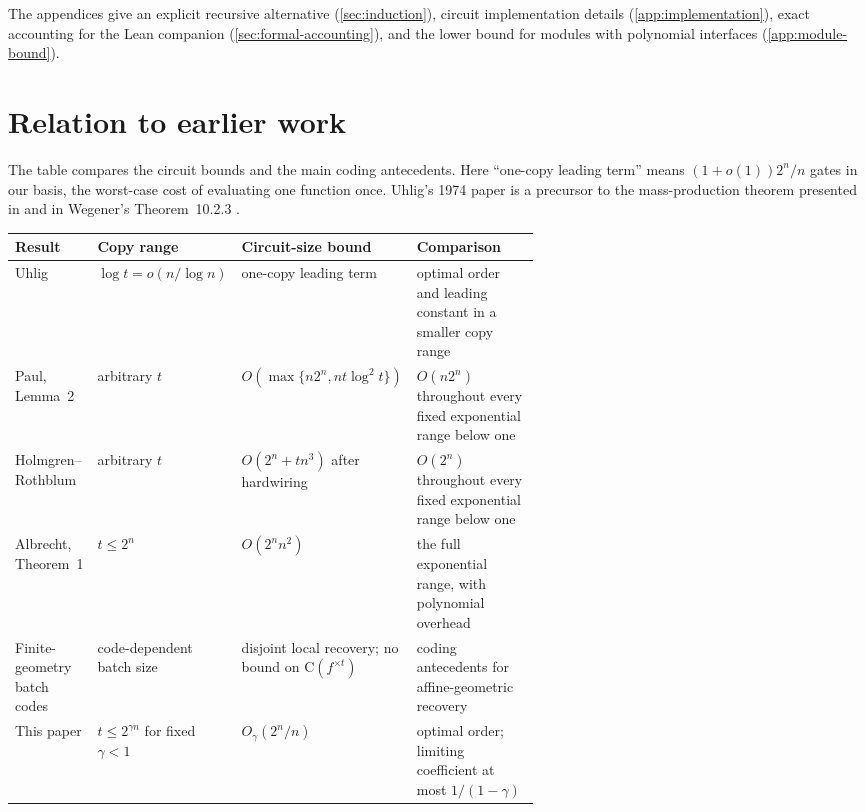 \documentclass[11pt]{article}
\newcommand{\C}{\mathrm{C}}
\begin{document}
The appendices give an explicit recursive alternative
(\cref{sec:induction}), circuit implementation details
(\cref{app:implementation}), exact accounting for the Lean companion
(\cref{sec:formal-accounting}), and the lower bound for modules with
polynomial interfaces (\cref{app:module-bound}).

\section{Relation to earlier work}\label{sec:related}

The table compares the circuit bounds and the main coding antecedents.
Here ``one-copy leading term'' means $(1+o(1))2^n/n$ gates in our basis,
the worst-case cost of evaluating one function once.
Uhlig's 1974 paper \cite{Uhlig1974} is a precursor to
the mass-production theorem presented in \cite{Uhlig1992} and in Wegener's
Theorem~10.2.3 \cite{Wegener1987}.

\begin{center}
\small
\begin{tabularx}{\linewidth}{@{}
  >{\raggedright\arraybackslash}p{0.14\linewidth}
  >{\raggedright\arraybackslash}p{0.20\linewidth}
  >{\raggedright\arraybackslash}p{0.27\linewidth}
  >{\raggedright\arraybackslash}X@{}}
\toprule
Result & Copy range & Circuit-size bound & Comparison \\
\midrule
Uhlig \cite{Uhlig1992,Wegener1987,Kretschmer2023}
  & $\log t=o(n/\log n)$
  & one-copy leading term
  & optimal order and leading constant in a smaller copy range \\
Paul, Lemma~2 \cite{Paul1976}
  & arbitrary $t$
  & $O(\max\{n2^n,nt\log^2t\})$
  & $O(n2^n)$ throughout every fixed exponential range below one \\
Holmgren--Rothblum \cite{HolmgrenRothblum2024}
  & arbitrary $t$
  & $O(2^n+tn^3)$ after hardwiring
  & $O(2^n)$ throughout every fixed exponential range below one \\
Albrecht, Theorem~1 \cite{Albrecht1989}
  & $t\le2^n$
  & $O(2^n n^2)$
  & the full exponential range, with polynomial overhead \\
Finite-geometry batch codes \cite{IKOS2004,PolyanskiiVorobyev2019}
  & code-dependent batch size
  & disjoint local recovery; no bound on $\C(f^{\times t})$
  & coding antecedents for affine-geometric recovery \\
This paper
  & $t\le2^{\gamma n}$ for fixed $\gamma<1$
  & $O_\gamma(2^n/n)$
  & optimal order; limiting coefficient at most $1/(1-\gamma)$ \\
\bottomrule
\end{tabularx}
\end{center}
\end{document}
